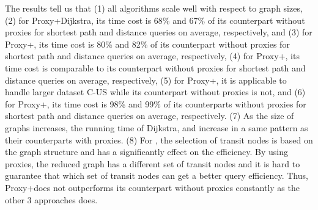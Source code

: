 
The results tell us that (1) all algorithms scale well with respect to graph sizes, (2) for Proxy+Dijkstra, its time cost is 68\% and 67\% of  its counterpart without proxies for shortest path and distance queries on average, respectively, and (3) for Proxy+\arcflag, its time cost is 80\% and 82\% of its counterpart without proxies for shortest  path and distance queries on average, respectively, (4) for Proxy+\tnr, its time cost is comparable to its counterpart without proxies for shortest path and distance queries on average, respectively, (5) for Proxy+\tnr, it is applicable to handle larger dataset C-US while its counterpart \tnr without proxies is not, and (6) for Proxy+\ah, its time cost is 98\% and 99\% of its counterparts without proxies for shortest path and distance queries on average, respectively. (7) As the size of graphs increases, the running time of Dijkstra, \arcflag and \ah increase in a same pattern as their counterparts with proxies. (8) For \tnr, the selection of transit nodes is based on the graph structure and has a significantly effect on the efficiency. By using proxies, the reduced graph has a different set of transit nodes and it is hard to guarantee that which set of transit nodes can get a better query efficiency. Thus, Proxy+\tnr does not outperforms its counterpart without proxies constantly as the other 3 approaches does.   %



